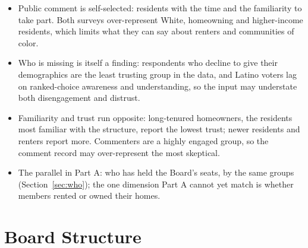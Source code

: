 \begin{itemize}
  \item Public comment is self-selected: residents with the time and the
    familiarity to take part. Both surveys over-represent White, homeowning and
    higher-income residents, which limits what they can say about renters and
    communities of color.
  \item Who is missing is itself a finding: respondents who decline to give
    their demographics are the least trusting group in the data, and Latino
    voters lag on ranked-choice awareness and understanding, so the input may
    understate both disengagement and distrust.
  \item Familiarity and trust run opposite: long-tenured homeowners, the
    residents most familiar with the structure, report the lowest trust; newer
    residents and renters report more. Commenters are a highly engaged group,
    so the comment record may over-represent the most skeptical.
  \item The parallel in Part A: who has held the Board's seats, by the same
    groups (Section~\ref{sec:who}); the one dimension Part A cannot yet match is
    whether members rented or owned their homes.
\end{itemize}

\section{Board Structure}


